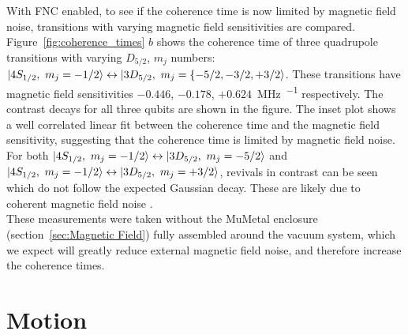     With FNC enabled, to see if the coherence time is now limited by magnetic field noise, transitions with varying magnetic field sensitivities are compared. Figure~\ref{fig:coherence_times} $b$ shows the coherence time of three quadrupole transitions with varying $D_{5/2}$, $m_j$ numbers: $\ket{4S_{1/2},~m_j=-1/2} \leftrightarrow \ket{3D_{5/2},~m_j=\lbrace -5/2, -3/2, +3/2}$. These transitions have magnetic field sensitivities $-0.446$, $-0.178$, $+0.624$~\unit{\MHz\per\gauss} respectively. The contrast decays for all three qubits are shown in the figure. The inset plot shows a well correlated linear fit between the coherence time and the magnetic field sensitivity, suggesting that the coherence time is limited by magnetic field noise. For both $\ket{4S_{1/2},~m_j=-1/2} \leftrightarrow \ket{3D_{5/2},~m_j=-5/2}$ and $\ket{4S_{1/2},~m_j=-1/2} \leftrightarrow \ket{3D_{5/2},~m_j=+3/2}$, revivals in contrast can be seen which do not follow the expected Gaussian decay. These are likely due to coherent magnetic field noise .\\
    These measurements were taken without the MuMetal enclosure (section~\ref{sec:Magnetic Field}) fully assembled around the vacuum system, which we expect will greatly reduce external magnetic field noise, and therefore increase the coherence times.


\section{Motion}
\label{sec:Motion}

